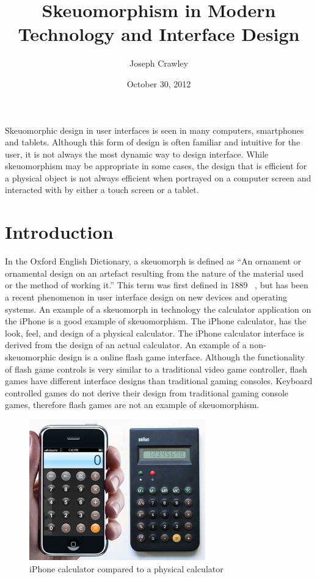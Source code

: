 \documentclass{article}
\title{Skeuomorphism in Modern Technology and Interface Design}
\author{Joseph Crawley}
\date{October 30, 2012}
\begin{document}
\maketitle

\abstract{}
Skeuomorphic design in user interfaces is seen in many computers, smartphones and tablets. Although this form of design is often familiar and intuitive for the user, it is not always the most dynamic way to design interface. While skeuomorphism may be appropriate in some cases, the design that is efficient for a physical object is not always efficient when portrayed on a computer screen and interacted with by either a touch screen or a tablet. 


\pagebreak
\tableofcontents


\listoffigures


\listoftables

\pagebreak

%
%
\section{Introduction}
\label{introduction}

In the Oxford English Dictionary, a skeuomorph is defined as “An ornament or ornamental design on an artefact resulting from the nature of the material used or the method of working it.” This term was first defined in 1889 ~\cite{oed}, but has been a recent phenomenon in user interface design on new devices and operating systems. An example of a skeuomorph in technology the calculator application on the iPhone is a good example of skeuomorphism. The iPhone calculator, has the look, feel, and design of a physical calculator. The iPhone calculator interface is derived from the design of an actual calculator. An example of a non-skeuomorphic design is a online flash game interface. Although the functionality of flash game controls is very similar to a traditional video game controller, flash games have different interface designs than traditional gaming consoles. Keyboard controlled games do not derive their design from traditional gaming console games, therefore flash games are not an example of skeuomorphism.
\begin{figure}
\centering
\includegraphics[width=3in]{calculator.jpeg} 

\caption{iPhone calculator compared to a physical calculator}
\label{calc}
\end{figure}
\end{document}
